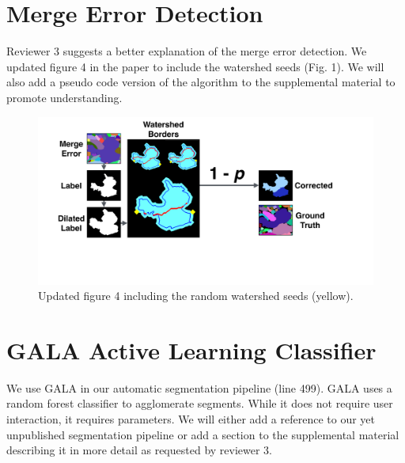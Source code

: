 \documentclass[10pt,twocolumn,letterpaper]{article}
\begin{document}
\begin{table}[h]
\caption{Average proofreading speed for novice users of Dojo, FP and GP. Higher VI reduction per minute shows better performance of GP.}%
\label{tab:correctiontimes}
\end{table}

\section{Merge Error Detection}

Reviewer 3 suggests a better explanation of the merge error detection. We updated figure 4 in the paper to include the watershed seeds (Fig. 1). We will also add a pseudo code version of the algorithm to the supplemental material to promote understanding.

\begin{figure}[h]
\centering
\includegraphics[width=\linewidth]{gfx/merge_error_v5.pdf}
\caption{Updated figure 4 including the random watershed seeds (yellow).}
\label{fig:merge_error}
\end{figure}


\section{GALA Active Learning Classifier}

We use GALA in our automatic segmentation pipeline (line 499). GALA uses a random forest classifier to agglomerate segments. While it does not require user interaction, it requires parameters. We will either add a reference to our yet unpublished segmentation pipeline or add a section to the supplemental material describing it in more detail as requested by reviewer 3.

%
%
\end{document}
